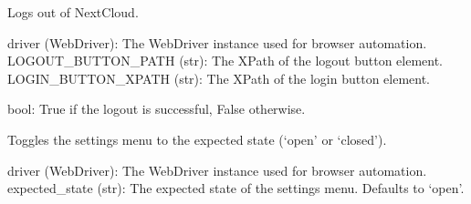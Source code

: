 \documentclass[letterpaper,10pt,english]{sphinxmanual}
\begin{document}
\begin{fulllineitems}
\label{\detokenize{utils:utils.authentication_management.perform_logout}}
\pysigstartsignatures
{}
\pysigstopsignatures
\sphinxAtStartPar
Logs out of NextCloud.
\begin{description}
\sphinxAtStartPar
driver (WebDriver): The WebDriver instance used for browser automation.
LOGOUT\_BUTTON\_PATH (str): The XPath of the logout button element.
LOGIN\_BUTTON\_XPATH (str): The XPath of the login button element.

\sphinxAtStartPar
bool: True if the logout is successful, False otherwise.

\end{description}

\end{fulllineitems}


\begin{fulllineitems}
\label{\detokenize{utils:utils.authentication_management.toggle_settings_menu}}
\pysigstartsignatures
{}
\pysigstopsignatures
\sphinxAtStartPar
Toggles the settings menu to the expected state (‘open’ or ‘closed’).
\begin{description}
\sphinxAtStartPar
driver (WebDriver): The WebDriver instance used for browser automation.
expected\_state (str): The expected state of the settings menu. Defaults to ‘open’.

\end{description}

\end{fulllineitems}
\end{document}
